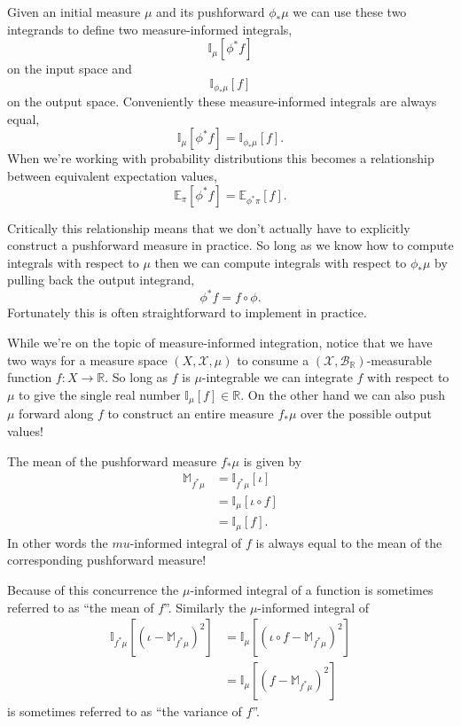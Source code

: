 \documentclass[
  letterpaper,
  DIV=11,
  numbers=noendperiod]{scrartcl}
\begin{document}
Given an initial measure \(\mu\) and its pushforward \(\phi_{*} \mu\) we
can use these two integrands to define two measure-informed integrals,
\[
\mathbb{I}_{\mu} [ \phi^{*} f ]
\] on the input space and \[
\mathbb{I}_{\phi_{*} \mu} [ f ]
\] on the output space. Conveniently these measure-informed integrals
are always equal, \[
\mathbb{I}_{\mu} [ \phi^{*} f ] = \mathbb{I}_{\phi_{*} \mu} [ f ].
\] When we're working with probability distributions this becomes a
relationship between equivalent expectation values, \[
\mathbb{E}_{\pi} [ \phi^{*} f ]
=
\mathbb{E}_{\phi^{*} \pi} [ f ].
\]

Critically this relationship means that we don't actually have to
explicitly construct a pushforward measure in practice. So long as we
know how to compute integrals with respect to \(\mu\) then we can
compute integrals with respect to \(\phi_{*} \mu\) by pulling back the
output integrand, \[
\phi^{*} f = f \circ \phi.
\] Fortunately this is often straightforward to implement in practice.

While we're on the topic of measure-informed integration, notice that we
have two ways for a measure space \((X, \mathcal{X}, \mu)\) to consume a
\((\mathcal{X}, \mathcal{B}_{\mathbb{R}})\)-measurable function
\(f : X \rightarrow \mathbb{R}\). So long as \(f\) is \(\mu\)-integrable
we can integrate \(f\) with respect to \(\mu\) to give the single real
number \(\mathbb{I}_{\mu}[f] \in \mathbb{R}\). On the other hand we can
also push \(\mu\) forward along \(f\) to construct an entire measure
\(f_{*} \mu\) over the possible output values!

The mean of the pushforward measure \(f_{*} \mu\) is given by
\begin{align*}
\mathbb{M}_{f^{*} \mu}
&=
\mathbb{I}_{f^{*} \mu} [ \iota ]
\\
&=
\mathbb{I}_{\mu} [ \iota \circ f ]
\\
&=
\mathbb{I}_{\mu} [ f ].
\end{align*} In other words the \(mu\)-informed integral of \(f\) is
always equal to the mean of the corresponding pushforward measure!

Because of this concurrence the \(\mu\)-informed integral of a function
is sometimes referred to as ``the mean of \(f\)''. Similarly the
\(\mu\)-informed integral of \begin{align*}
\mathbb{I}_{f^{*} \mu} [ (\iota - \mathbb{M}_{f^{*} \mu})^{2} ]
&=
\mathbb{I}_{\mu} [ (\iota \circ f - \mathbb{M}_{f^{*} \mu})^{2} ]
\\
&=
\mathbb{I}_{\mu} [ (f - \mathbb{M}_{f^{*} \mu})^{2} ]
\end{align*} is sometimes referred to as ``the variance of \(f\)''.
\end{document}
